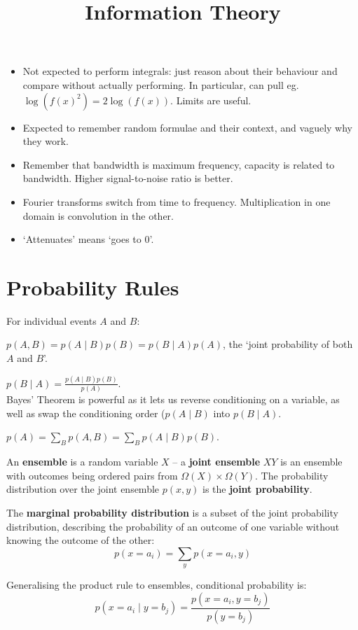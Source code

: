 \documentclass[a4paper, 11pt]{article}
\title{\vspace{-2cm}Information Theory\vspace{-1.5cm}}
\author{}
\date{}
\begin{document}
\maketitle

\begin{itemize}
\item Not expected to perform integrals: just reason about their behaviour and compare without actually performing. In particular, can pull eg.\ \(\log(f(x)^2) = 2\log(f(x))\). Limits are useful.
\item Expected to remember random formulae and their context, and vaguely why they work.
\item Remember that bandwidth is maximum frequency, capacity is related to bandwidth. Higher signal-to-noise ratio is better.
\item Fourier transforms switch from time to frequency. Multiplication in one domain is convolution in the other.
\item `Attenuates' means `goes to 0'.
\end{itemize}

\section*{Probability Rules}
{
    For individual events \(A\) and \(B\):
    \begin{description}
    \setlength{\itemsep}{3mm}
    \item[Product Rule:] \(\displaystyle p(A,B) = p(A \mid B)p(B) = p(B \mid A)p(A)\), the `joint probability of both \(A\) and \(B\)'.
    \item[Bayes' Theorem:] \(\displaystyle p(B  \mid A) = \frac{p(A \mid B)p(B)}{p(A)}\).\\Bayes' Theorem is powerful as it lets us reverse conditioning on a variable, as well as swap the conditioning order (\(p(A \mid B)\) into \(p(B \mid A)\).
    \item[Sum Rule:] \(\displaystyle p(A) = \sum_B{p(A,B)} = \sum_B{p(A \mid B)p(B)}\).
    \end{description}

    An \textbf{ensemble} is a random variable \(X\) -- a \textbf{joint ensemble} \(XY\) is an ensemble with outcomes being ordered pairs from \(\Omega(X) \times \Omega(Y)\). The probability distribution over the joint ensemble \(p(x,y)\) is the \textbf{joint probability}.

    The \textbf{marginal probability distribution} is a subset of the joint probability distribution, describing the probability of an outcome of one variable without knowing the outcome of the other:
    \[p(x=a_i) = \sum_y{p(x=a_i,y)}\]

    Generalising the product rule to ensembles, conditional probability is:
    \[p(x=a_i \mid y=b_j) = \frac{p(x=a_i,y=b_j)}{p(y=b_j)}\]
}
\end{document}
